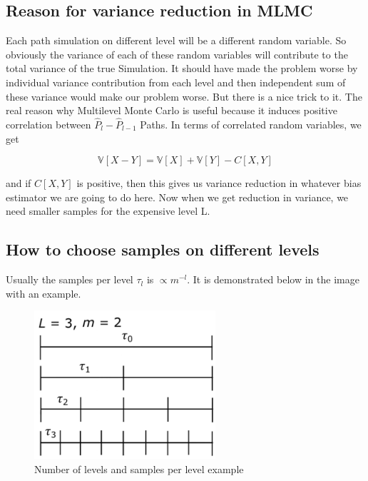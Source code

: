 \documentclass[12pt]{article}
\newcommand{\V}{\mathbb{V}}
\begin{document}
\clearpage

\subsection{Reason for variance reduction in MLMC}

Each path simulation on different level will be a different random variable. So obviously the variance of each of these random variables will contribute to the total variance of the true Simulation. It should have made the problem worse by individual variance contribution from each level and then independent sum of these variance would make our problem worse. But there is a nice trick to it. The real reason why Multilevel Monte Carlo is useful because it induces positive correlation between $\hat{P}_l - \hat{P}_{l-1}$ Paths. In terms of correlated random variables, we get 

\begin{equation} \V[X-Y] = \V[X] + \V[Y] - C[X,Y]\end{equation} 

and if $C[X,Y]$ is positive, then this gives us variance reduction in whatever bias estimator we are going to do here. Now when we get reduction in variance, we need smaller samples for the expensive level L.

\subsection{How to choose samples on different levels}

Usually the samples per level $\tau_l $ is $ \propto m^{-l}$. It is demonstrated below in the image with an example.

\begin{figure}[h!]
\centering
\includegraphics[width=0.6\textwidth]{Samples.png}
\caption{Number of levels and samples per level example}
\end{figure}
\end{document}
